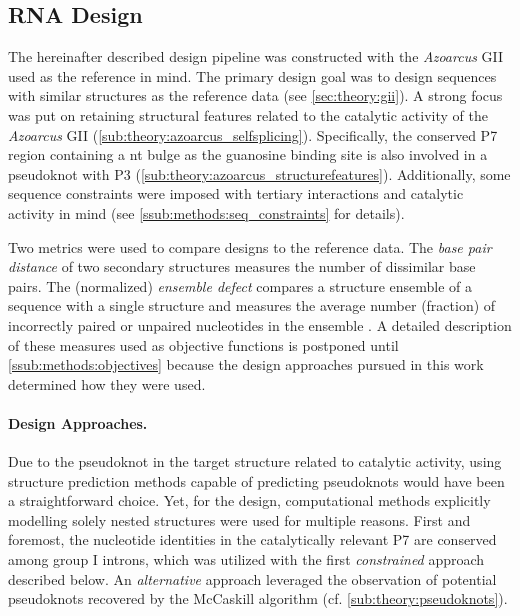 \documentclass[../../master.tex]{subfiles}
\begin{document}
\subsection{RNA Design}
\label{sub:methods:design_pipeline}

The hereinafter described design pipeline was constructed with the \textit{Azoarcus} GII used as the reference in mind.
The primary design goal was to design sequences with similar structures as the reference data (see \autoref{sec:theory:gii}).
A strong focus was put on retaining structural features related to the catalytic activity of the \textit{Azoarcus} GII (\autoref{sub:theory:azoarcus_selfsplicing}).
Specifically, the conserved P7 region containing a \unit[1]{nt} bulge as the guanosine binding site is also involved in a pseudoknot with P3 (\autoref{sub:theory:azoarcus_structurefeatures}).
Additionally, some sequence constraints were imposed with tertiary interactions and catalytic activity in mind (see \autoref{ssub:methods:seq_constraints} for details).


Two metrics were used to compare designs to the reference data.
The \emph{base pair distance} of two secondary structures measures the number of dissimilar base pairs.
The (normalized) \emph{ensemble defect} compares a structure ensemble of a sequence with a single structure and measures the average number (fraction) of incorrectly paired or unpaired nucleotides in the ensemble \parencite{dirks_paradigms_2004}.
A detailed description of these measures used as objective functions is postponed until \autoref{ssub:methods:objectives} because the design approaches pursued in this work determined how they were used. 

\paragraph{Design Approaches.}
\label{par:methods:design_approaches}

Due to the pseudoknot in the target structure related to catalytic activity, using structure prediction methods capable of predicting pseudoknots would have been a straightforward choice.
Yet, for the design, computational methods explicitly modelling solely nested structures were used for multiple reasons.
First and foremost, the nucleotide identities in the catalytically relevant P7 are conserved among group I introns, which was utilized with the first \emph{constrained} approach described below.
An \emph{alternative} approach leveraged the observation of potential pseudoknots recovered by the McCaskill algorithm (cf. \autoref{sub:theory:pseudoknots}).
\end{document}
